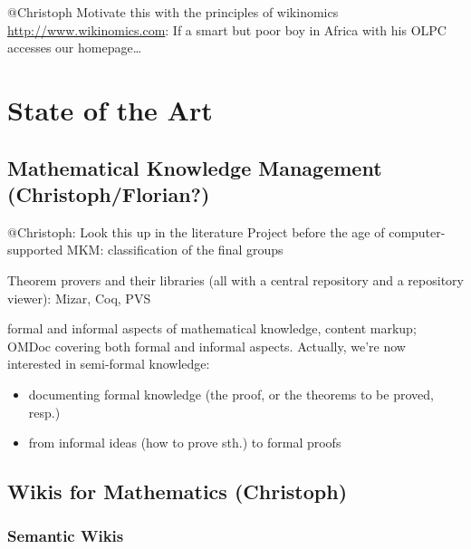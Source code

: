 \documentclass{llncs}
\begin{document}
\begin{todo}{@Christoph}
  Motivate this with the principles of wikinomics \url{http://www.wikinomics.com}: If a
  smart but poor boy in Africa with his OLPC accesses our homepage\ldots
\end{todo}

\section{State of the Art}
\label{sec:sota}

\subsection{Mathematical Knowledge Management (Christoph/Florian?)}
\label{sec:mkm}

\begin{todo}{@Christoph: Look this up in the literature}
Project before the age of computer-supported MKM: classification of the final groups
\end{todo}

Theorem provers and their libraries (all with a central repository and a repository
viewer): Mizar, Coq, PVS

formal and informal aspects of mathematical knowledge, content markup; OMDoc covering both
formal and informal aspects.  Actually, we're now interested in semi-formal
knowledge:
\begin{itemize}
\item documenting formal knowledge (the proof, or the theorems to be proved, resp.)
\item from informal ideas (how to prove sth.) to formal proofs
\end{itemize}

\subsection{Wikis for Mathematics (Christoph)}
\label{sec:math-wiki}

\subsubsection{Semantic Wikis}
\label{sec:semwiki}
\end{document}
